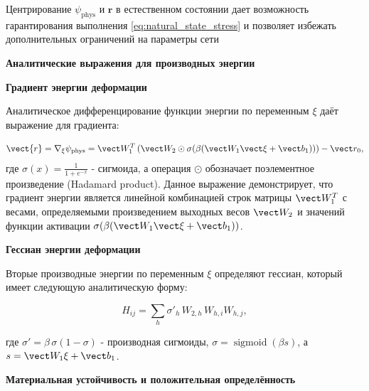 Центрирование $\psi_{\mathrm{phys}}$ и $\mathbf{r}$ в естественном состоянии 
дает возможность гарантирования выполнения \eqref{eq:natural_state_stress} и
позволяет избежать дополнительных ограничений на параметры сети






\textbf{Аналитические выражения для производных энергии}

\textbf{Градиент энергии деформации}

Аналитическое дифференцирование функции энергии по переменным \(\xi\) даёт выражение для градиента:

\begin{equation}
 \vect{r} = \nabla_\xi \psi_{\mathrm{phys}} = \vect W_1^T \left( \vect W_2 \odot \sigma(\beta (\vect W_1 \vect \xi + \vect b_1)) \right) - \vect r_0,
\label{eq:energy_gradient}
\end{equation}
где $\sigma(x) = \frac{1}{1 + e^{-x}}$ - сигмоида, 
а операция $\odot$ обозначает поэлементное произведение (Hadamard product). 
Данное выражение демонстрирует, что градиент энергии является линейной комбинацией строк матрицы $\vect W_1^T$ с весами, 
определяемыми произведением выходных весов $\vect W_2$ и значений функции активации $\sigma(\beta (\vect W_1 \vect\xi + \vect b_1))$.

\textbf{Гессиан энергии деформации}

Вторые производные энергии по переменным \(\xi\) определяют гессиан, который имеет следующую аналитическую форму:

\begin{equation}
 H_{ij} = \sum_h \sigma'_h\,W_{2,h}\,W_{h,i}W_{h,j},
\label{eq:energy_hessian}
\end{equation}

где $\sigma' = \beta\,\sigma(1-\sigma)$ - производная сигмоиды, 
$\sigma=\operatorname{sigmoid}(\beta s)$, а $s=\vect W_1\xi+\vect b_1$.

\textbf{Материальная устойчивость и положительная определённость}

